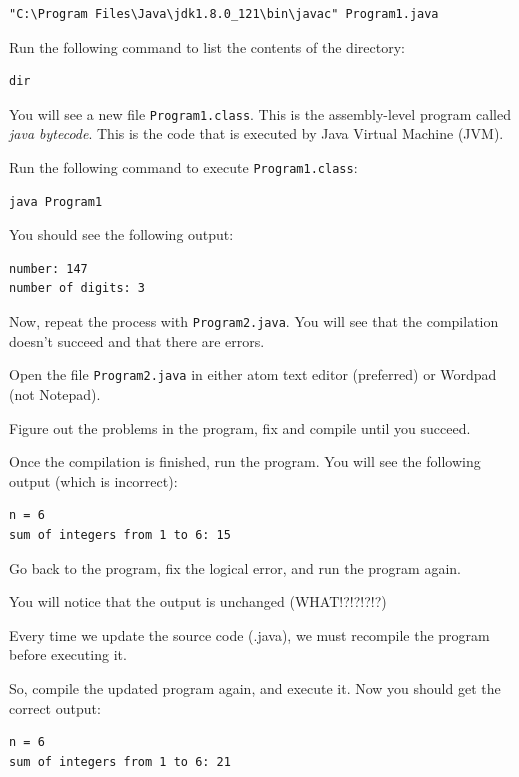 \begin{questions}
\begin{verbatim}
"C:\Program Files\Java\jdk1.8.0_121\bin\javac" Program1.java	
\end{verbatim}

Run the following command to list the contents of the directory:

\begin{verbatim}
dir
\end{verbatim}

You will see a new file \texttt{Program1.class}. This is the assembly-level program called \emph{java bytecode}. This is the code that is executed by Java Virtual Machine (JVM).

Run the following command to execute \texttt{Program1.class}:

\begin{verbatim}
java Program1	
\end{verbatim}

You should see the following output:

\begin{lstlisting}[numbers=none]
number: 147
number of digits: 3
\end{lstlisting}

Now, repeat the process with \texttt{Program2.java}. You will see that the compilation doesn't succeed and that there are errors.

Open the file \texttt{Program2.java} in either atom text editor (preferred) or Wordpad (not Notepad).

Figure out the problems in the program, fix and compile until you succeed.

Once the compilation is finished, run the program. You will see the following output (which is incorrect):

\begin{lstlisting}[numbers=none]
n = 6
sum of integers from 1 to 6: 15	
\end{lstlisting}

Go back to the program, fix the logical error, and run the program again.

You will notice that the output is unchanged (WHAT!?!?!?!?)

Every time we update the source code (.java), we must recompile the program before executing it.

So, compile the updated program again, and execute it. Now you should get the correct output:

\begin{lstlisting}[numbers=none]
n = 6
sum of integers from 1 to 6: 21
\end{lstlisting}


\end{questions}
